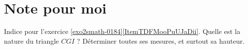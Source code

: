 \section{Note pour moi}

Indice pour l'exercice \ref{exo2smath-0184}\ref{ItemTDFMooPuUJaDii}. Quelle est la nature du triangle \( CGI\) ? Déterminer toutes ses mesures, et surtout sa hauteur.


